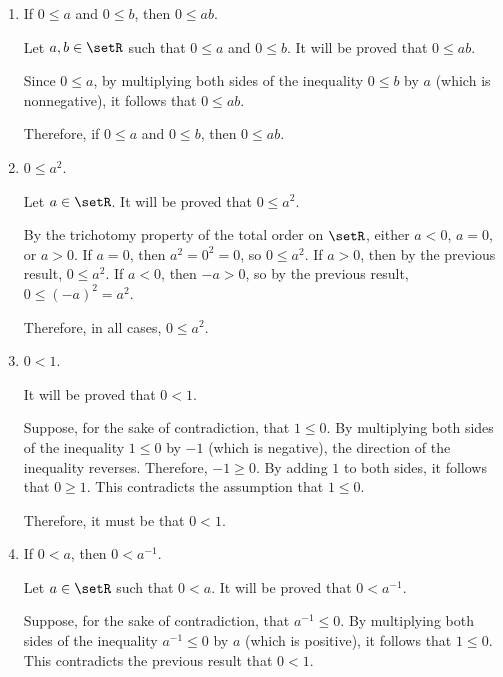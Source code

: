 \begin{enumerate}
\begin{enumerate}
\begin{subprove}
      Therefore, if \(a \le b\) and \(c \le 0\), then \(b c \le a c\).
    \end{subprove}
    \item If \(0\le a\) and \(0\le b\), then \(0\le ab\).
    \begin{subprove}
      Let \(a, b \in \setR\) such that \(0 \le a\) and \(0 \le b\).
      It will be proved that \(0 \le a b\).
      
      Since \(0 \le a\), by multiplying both sides of the inequality \(0 \le b\) by \(a\) (which is nonnegative), it follows that \(0 \le a b\).
      
      Therefore, if \(0 \le a\) and \(0 \le b\), then \(0 \le a b\).
    \end{subprove}
    \item \(0\le a^2\).
    \begin{subprove}
      Let \(a \in \setR\).
      It will be proved that \(0 \le a^{2}\).
      
      By the trichotomy property of the total order on \(\setR\), either \(a < 0\), \(a = 0\), or \(a > 0\).
      If \(a = 0\), then \(a^{2} = 0^{2} = 0\), so \(0 \le a^{2}\).
      If \(a > 0\), then by the previous result, \(0 \le a^{2}\).
      If \(a < 0\), then \(-a > 0\), so by the previous result, \(0 \le (-a)^{2} = a^{2}\).
      
      Therefore, in all cases, \(0 \le a^{2}\).
    \end{subprove}
    \item \(0<1\).
    \begin{subprove}
      It will be proved that \(0 < 1\).
      
      Suppose, for the sake of contradiction, that \(1 \le 0\).
      By multiplying both sides of the inequality \(1 \le 0\) by \(-1\) (which is negative), the direction of the inequality reverses.
      Therefore, \(-1 \ge 0\).
      By adding \(1\) to both sides, it follows that \(0 \ge 1\).
      This contradicts the assumption that \(1 \le 0\).
      
      Therefore, it must be that \(0 < 1\).
    \end{subprove}
    \item If \(0<a\), then \(0<a^{-1}\).
    \begin{subprove}
      Let \(a \in \setR\) such that \(0 < a\).
      It will be proved that \(0 < a^{-1}\).
      
      Suppose, for the sake of contradiction, that \(a^{-1} \le 0\).
      By multiplying both sides of the inequality \(a^{-1} \le 0\) by \(a\) (which is positive), it follows that \(1 \le 0\).
      This contradicts the previous result that \(0 < 1\).
      

\end{subprove}
\end{enumerate}
\end{enumerate}
